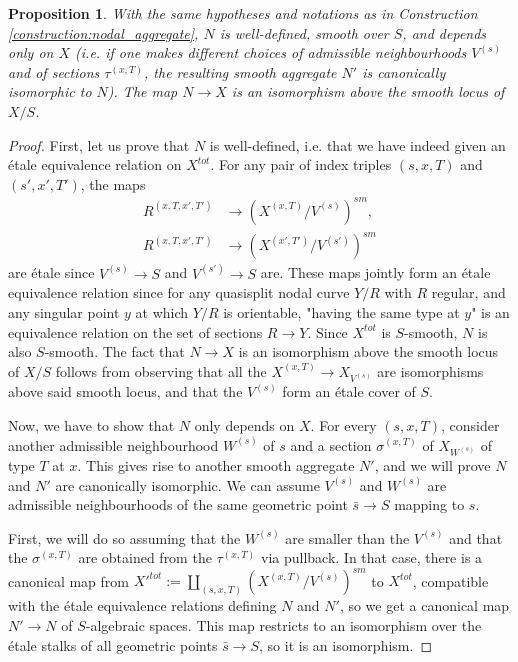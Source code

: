 \documentclass[a4paper,12pt]{amsart} %
\numberwithin{equation}{subsection}
\theoremstyle{definition}
\theoremstyle{plain}%
\newtheorem{proposition}[definition]{Proposition}
\theoremstyle{remark}
\begin{document}
\begin{proposition}\label{proposition:nodal_aggregates_well_def}
With the same hypotheses and notations as in Construction \ref{construction:nodal_aggregate}, $N$ is well-defined, smooth over $S$, and depends only on $X$ (i.e. if one makes different choices of admissible neighbourhoods $V^{(s)}$ and of sections $\tau^{(x,T)}$, the resulting smooth aggregate $N'$ is canonically isomorphic to $N$). The map $N\to X$ is an isomorphism above the smooth locus of $X/S$.
\end{proposition}

\begin{proof}
First, let us prove that $N$ is well-defined, i.e. that we have indeed given an \'etale equivalence relation on $X^{tot}$. For any pair of index triples $(s,x,T)$ and $(s',x',T')$, the maps
\begin{align*}
R^{(x,T,x',T')}&\to (X^{(x,T)}/V^{(s)})^{sm},\\
R^{(x,T,x',T')}&\to (X^{(x',T')}/V^{(s')})^{sm}
\end{align*}
are \'etale since $V^{(s)}\to S$ and $V^{(s')}\to S$ are. These maps jointly form an \'etale equivalence relation since for any quasisplit nodal curve $Y/R$ with $R$ regular, and any singular point $y$ at which $Y/R$ is orientable, "having the same type at $y$" is an equivalence relation on the set of sections $R \to Y$. Since $X^{tot}$ is $S$-smooth, $N$ is also $S$-smooth. The fact that $N\to X$ is an isomorphism above the smooth locus of $X/S$ follows from observing that all the $X^{(x,T)}\to X_{V^{(s)}}$ are isomorphisms above said smooth locus, and that the $V^{(s)}$ form an \'etale cover of $S$.

Now, we have to show that $N$ only depends on $X$. For every $(s,x,T)$, consider another admissible neighbourhood $W^{(s)}$ of $s$ and a section $\sigma^{(x,T)}$ of $X_{W^{(s)}}$ of type $T$ at $x$. This gives rise to another smooth aggregate $N'$, and we will prove $N$ and $N'$ are canonically isomorphic. We can assume $V^{(s)}$ and $W^{(s)}$ are admissible neighbourhoods of the same geometric point $\bar s \to S$ mapping to $s$.

First, we will do so assuming that the $W^{(s)}$ are smaller than the $V^{(s)}$ and that the $\sigma^{(x,T)}$ are obtained from the $\tau^{(x,T)}$ via pullback. In that case, there is a canonical map from $X'^{tot}:=\coprod\limits_{(s,x,T)} (X^{(x,T)}/V^{(s)})^{sm}$ to $X^{tot}$, compatible with the \'etale equivalence relations defining $N$ and $N'$, so we get a canonical map $N'\to N$ of $S$-algebraic spaces. This map restricts to an isomorphism over the \'etale stalks of all geometric points $\bar s\to S$, so it is an isomorphism.


\end{proof}
\end{document}
